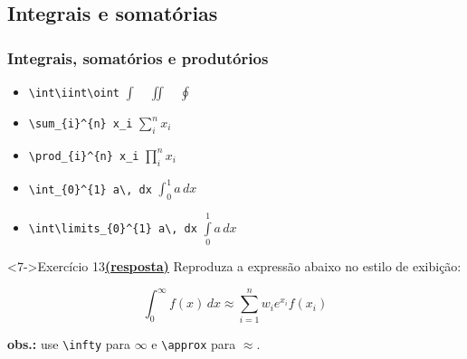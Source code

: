 \documentclass[handout,10pt]{beamer}
\begin{document}
\subsection{Integrais e somatórias}
\begin{frame}[fragile]
	\frametitle{Integrais, somatórios e produtórios}
	
	\begin{atividade}{6}
		\begin{itemize}
			\item<2-> \verb|\int|\quad \verb|\iint|\quad \verb|\oint| \hfill \(\int \quad \iint \quad \oint\)
			\item<3-> \verb|\sum_{i}^{n} x_i| \hfill \(\sum_{i}^{n} x_i\)
			\item<4-> \verb|\prod_{i}^{n} x_i| \hfill \(\prod_{i}^{n} x_i\)
			\item<5-> \verb|\int_{0}^{1} a\, dx| \hfill \(\int_{0}^{1} a\, dx\)
			\item<6-> \verb|\int\limits_{0}^{1} a\, dx| \hfill \(\int\limits_0^1 a\, dx\)
		\end{itemize}
	\end{atividade}
	
	
	\begin{block}<7->{Exercício 13\hyperlink{respostas9-13}{\footnotesize\textbf{(resposta)}}}
		Reproduza a expressão abaixo no estilo de exibição:
		
		\[\int_0^\infty f(x)\, dx \approx \sum_{i = 1}^n w_i e^{x_i} f(x_i)\]
		
		\footnotesize\textbf{obs.:} use \verb|\infty| para \(\infty\) e \verb|\approx| para \(\approx\).
	\end{block}
	
\end{frame}
\end{document}
